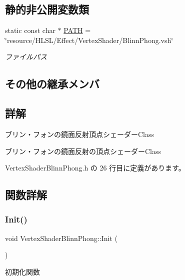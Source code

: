 \subsection*{静的非公開変数類}
\begin{DoxyCompactItemize}
\item 
static const char $\ast$ \mbox{\hyperlink{class_vertex_shader_blinn_phong_a7b721175a17910728b9d2b887f567730}{P\+A\+TH}} = \char`\"{}resource/H\+L\+SL/Effect/Vertex\+Shader/Blinn\+Phong.\+vsh\char`\"{}
\begin{DoxyCompactList}\small\item\em ファイルパス \end{DoxyCompactList}\end{DoxyCompactItemize}
\subsection*{その他の継承メンバ}


\subsection{詳解}
ブリン・フォンの鏡面反射頂点シェーダー\+Class 

ブリン・フォンの鏡面反射の頂点シェーダー\+Class 

 Vertex\+Shader\+Blinn\+Phong.\+h の 26 行目に定義があります。



\subsection{関数詳解}
\mbox{\label{class_vertex_shader_blinn_phong_a565b15a20d6c73d8b8e0c7dcc3078464}} 
\subsubsection{\texorpdfstring{Init()}{Init()}}
{\footnotesize\ttfamily void Vertex\+Shader\+Blinn\+Phong\+::\+Init (\begin{DoxyParamCaption}{ }\end{DoxyParamCaption})\hspace{0.3cm}{\ttfamily [virtual]}}



初期化関数 


